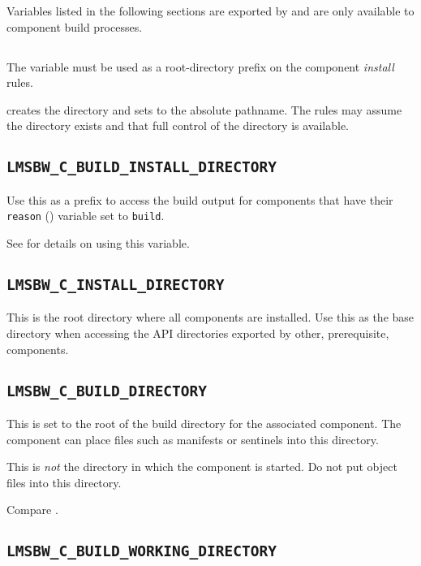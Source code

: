 Variables listed in the following sections are exported by \lmsbw and
are only available to component build processes.

\subsection{\destdir}

The \destdir variable must be used as a root-directory prefix on the
component \emph{install} rules.

\lmsbw creates the directory and sets \destdir to the absolute
pathname.  The rules may assume the directory exists and that full
control of the directory is available.


\subsection{\texttt{LMSBW\_C\_BUILD\_INSTALL\_DIRECTORY}}\label{wrap:build-install-directory}

Use this as a prefix to access the build output for components that
have their \texttt{reason} () variable set to
\texttt{build}.

See  for details on using this variable.

\subsection{\texttt{LMSBW\_C\_INSTALL\_DIRECTORY}}

This is the root directory where all components are installed.  Use
this as the base directory when accessing the API directories exported
by other, prerequisite, components.

\subsection{\texttt{LMSBW\_C\_BUILD\_DIRECTORY}}\label{wrap:lmsbw-c-build-directory}

This is set to the root of the build directory for the associated
component.  The component \makefile can place files such as \mtree
manifests or \make sentinels into this directory.

This is \emph{not} the directory in which the component \makefile is
started.   Do not put object files into this directory.

Compare .

\subsection{\texttt{LMSBW\_C\_BUILD\_WORKING\_DIRECTORY}}\label{wrap:lmsbw-c-build-working-directory}

